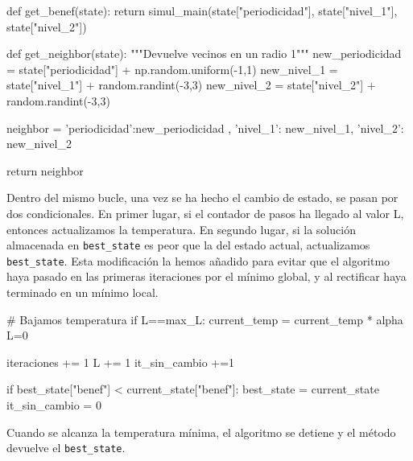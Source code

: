 \documentclass[a4paper,12pt]{article}
\begin{document}
	\begin{python}	
def get_benef(state):
  		return simul_main(state["periodicidad"],
  		                  state["nivel_1"], state["nivel_2"])

def get_neighbor(state):
	"""Devuelve vecinos en un radio 1"""
	new_periodicidad = state["periodicidad"] +  np.random.uniform(-1,1)
	new_nivel_1 = state["nivel_1"] +  random.randint(-3,3)
	new_nivel_2 = state["nivel_2"] +  random.randint(-3,3)

	neighbor = {'periodicidad':new_periodicidad ,  
					'nivel_1': new_nivel_1,
					'nivel_2': new_nivel_2 }

	return neighbor
	\end{python}		

	Dentro del mismo bucle, una vez se ha hecho el cambio de estado, se pasan por dos condicionales. En primer lugar, si el contador de pasos ha llegado al valor L, entonces
	actualizamos la temperatura. En segundo lugar, si la solución almacenada en \texttt{best\_state} es peor que la del estado actual, actualizamos \texttt{best\_state}.
	Esta modificación la hemos añadido para evitar que el algoritmo haya pasado en las primeras iteraciones por el mínimo global, y al rectificar haya terminado en un mínimo local.\\

	\begin{python}
	# Bajamos temperatura
	if L==max_L:
		current_temp = current_temp * alpha
		L=0
	
	iteraciones += 1
	L += 1
	it_sin_cambio +=1 
	
	if best_state["benef"] < current_state["benef"]:
		best_state = current_state		it_sin_cambio = 0
	\end{python}

	Cuando se alcanza la temperatura mínima, el algoritmo se detiene y el método devuelve el \texttt{best\_state}.

	
\end{document}
